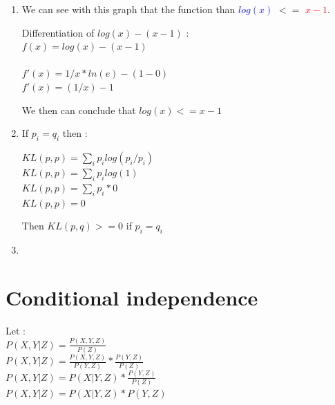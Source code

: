 \documentclass[]{article}
\begin{document}
\begin{enumerate}
  \item We can see with this graph that the function than \textcolor{blue}{$log(x)$} $<=$ \textcolor{red}{$x-1$}.

  Differentiation of $log(x)-(x-1)$ : \\

  $f(x) = log(x) - (x - 1)$ \\
  \\
  $f'(x) = 1/x*ln(e) - (1 - 0)$ \\
  $f'(x) = (1/x)-1$ \\

  \begin{center}
  \end{center}

  We then can conclude that $log(x) <= x-1$

  \item If $p_{i} = q_{i}$ then :

  $KL(p,p) = \sum_{i} p_{i}log(p_{i}/p_{i})$ \\
  $KL(p,p) = \sum_{i} p_{i}log(1)$ \\
  $KL(p,p) = \sum_{i} p_{i}*0$ \\
  $KL(p,p) = 0$


  Then $KL(p,q) >= 0$ if $p_{i} = q_{i}$

  \item
\end{enumerate}

\newpage

\section{Conditional independence}

Let : \\

$P(X,Y|Z) = \frac{P(X,Y,Z)}{P(Z)}$ \\

$P(X,Y|Z) = \frac{P(X,Y,Z)}{P(Y,Z)} * \frac{P(Y,Z)}{P(Z)}$ \\

$P(X,Y|Z) = P(X|Y,Z) * \frac{P(Y,Z)}{P(Z)}$ \\

$P(X,Y|Z) = P(X|Y,Z) * P(Y,Z)$ \\
\end{document}
